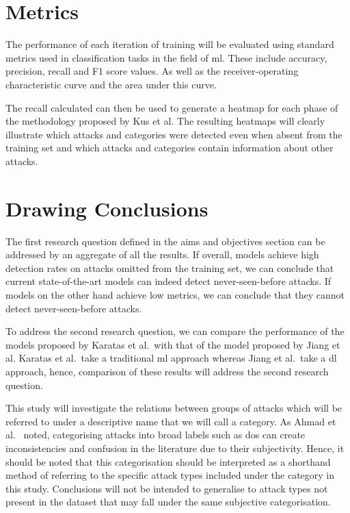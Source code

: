 \section{Metrics}%
\label{sec:metrics}

The performance of each iteration of training will be evaluated using standard
metrics used in classification tasks in the field of \gls{ml}. These include
accuracy, precision, recall and F1 score values. As well as the
receiver-operating characteristic curve and the area under this curve.

The recall calculated can then be used to generate a heatmap for each phase of
the methodology proposed by Kus et al. The resulting heatmaps will clearly
illustrate which attacks and categories were detected even when absent from the
training set and which attacks and categories contain information about other
attacks.

\section{Drawing Conclusions}%
\label{sec:conclusions}

The first research question defined in the aims and objectives section can be
addressed by an aggregate of all the results. If overall, models achieve high
detection rates on attacks omitted from the training set, we can conclude that
current state-of-the-art models can indeed detect never-seen-before attacks. If
models on the other hand achieve low metrics, we can conclude that they cannot
detect never-seen-before attacks.

To address the second research question, we can compare the performance of the
models proposed by Karatas et al.\ with that of the model proposed by Jiang et
al. Karatas et al.\ take a traditional \gls{ml} approach whereas Jiang et al.\
take a \gls{dl} approach, hence, comparison of these results will address the
second research question.

This study will investigate the relations between groups of attacks which will
be referred to under a descriptive name that we will call a category. As Ahmad
et al.~\cite{zero-day} noted, categorising attacks into broad labels such as
\gls{dos} can create inconsistencies and confusion in the literature due to
their subjectivity. Hence, it should be noted that this categorisation should
be interpreted as a shorthand method of referring to the specific attack types
included under the category in this study. Conclusions will not be intended to
generalise to attack types not present in the dataset that may fall under the
same subjective categorisation.
